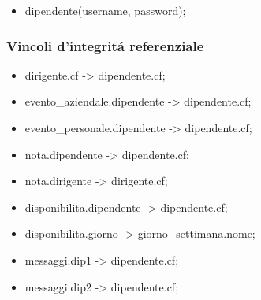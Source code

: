 \documentclass[paper=a4, fontsize=11pt]{scrartcl} %
\numberwithin{equation}{section} %
\numberwithin{figure}{section} %
\numberwithin{table}{section} %
\begin{document}
\begin{itemize}
  \item dipendente(username, password);

\end{itemize}



\subsubsection*{Vincoli d'integrit\'a referenziale}

\begin{itemize}

  \item dirigente.cf -> dipendente.cf;
  \item evento\_aziendale.dipendente -> dipendente.cf;
  \item evento\_personale.dipendente -> dipendente.cf;
  \item nota.dipendente -> dipendente.cf;
  \item nota.dirigente -> dirigente.cf;
  \item disponibilita.dipendente -> dipendente.cf;
  \item disponibilita.giorno -> giorno\_settimana.nome;
  \item messaggi.dip1 -> dipendente.cf;
  \item messaggi.dip2 -> dipendente.cf;


\end{itemize}
\end{document}
